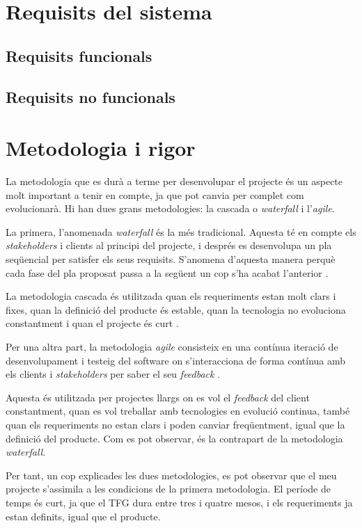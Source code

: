 \documentclass[a4paper]{article}
\begin{document}
\newpage
\section{Requisits del sistema}
\subsection{Requisits funcionals}
\subsection{Requisits no funcionals}

\newpage
\section{Metodologia i rigor}
La metodologia que es durà a terme per desenvolupar el projecte és un aspecte molt important a tenir en compte, ja que pot canvia per complet com evolucionarà. Hi han dues grans metodologies: la cascada o \textit{waterfall} i l'\textit{agile}.

La primera, l'anomenada \textit{waterfall} és la més tradicional. Aquesta té en compte els \textit{stakeholders} i clients al principi del projecte, i després es desenvolupa un pla seqüencial per satisfer els seus requisits. S'anomena d'aquesta manera perquè cada fase del pla proposat passa a la següent un cop s'ha acabat l'anterior \cite{waterfallModel}.

La metodologia cascada és utilitzada quan els requeriments estan molt clars i fixes, quan la definició del producte és estable, quan la tecnologia no evoluciona constantment i quan el projecte és curt \cite{waterfallTutorialsPoint}.

Per una altra part, la metodologia \textit{agile} consisteix en una contínua iteració de desenvolupament i testeig del software on s'interacciona de forma contínua amb els clients i \textit{stakeholders} per saber el seu \textit{feedback} \cite{agileVsWaterfall}.

Aquesta és utilitzada per projectes llargs on es vol el \textit{feedback} del client constantment, quan es vol treballar amb tecnologies en evolució continua, també quan els requeriments no estan clars i poden canviar freqüentment, igual que la definició del producte. Com es pot observar, és la contrapart de la metodologia \textit{waterfall}. 

Per tant, un cop explicades les dues metodologies, es pot observar que el meu projecte s'assimila a les condicions de la primera metodologia. El període de temps és curt, ja que el TFG dura entre tres i quatre mesos, i els requeriments ja estan definits, igual que el producte.
\end{document}
